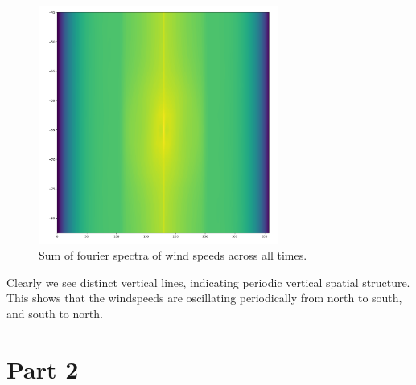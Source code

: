 \documentclass[a4paper, oneside]{book}
\begin{document}
\begin{figure}[htpb]
    \centering
    \includegraphics[width=0.7\textwidth]{./images/Pasted image 20231206105122.png}
    \caption{Sum of fourier spectra of wind speeds across all times.}
\end{figure}

Clearly we see distinct vertical lines, indicating periodic vertical spatial structure.
This shows that the windspeeds are oscillating periodically from north to south,
and south to north.


\section*{Part 2}
\end{document}
